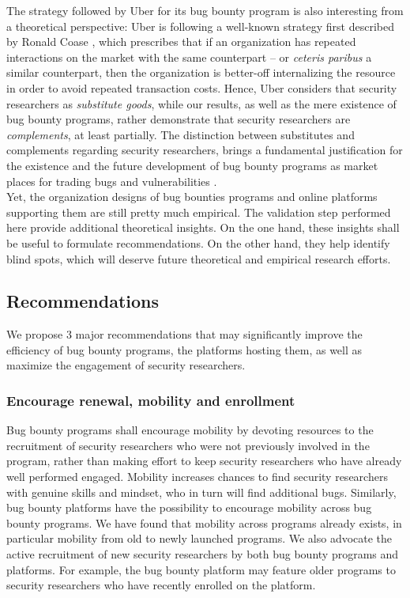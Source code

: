 The strategy followed by Uber for its bug bounty program is also interesting from a theoretical perspective: Uber is following a well-known strategy first described by Ronald Coase \cite{coase1937}, which prescribes that if an organization has repeated interactions on the market with the same counterpart -- or {\it ceteris paribus} a similar counterpart, then the organization is better-off internalizing the resource in order to avoid repeated transaction costs. Hence, Uber considers that security researchers as {\it substitute goods}, while our results, as well as the mere existence of bug bounty programs, rather demonstrate that security researchers are {\it complements}, at least partially. The distinction between substitutes and complements regarding security researchers, brings a fundamental justification for the existence and the future development of bug bounty programs as market places for trading bugs and vulnerabilities \cite{bohme2006comparison}. \\

Yet, the organization designs of bug bounties programs and online platforms supporting them are still pretty much empirical. The validation step performed here provide additional theoretical insights. On the one hand, these insights shall be useful to formulate recommendations. On the other hand, they help identify blind spots, which will deserve future theoretical and empirical research efforts.

\subsection{Recommendations}
We propose 3 major recommendations that may significantly improve the efficiency of bug bounty programs, the platforms hosting them, as well as maximize the engagement of security researchers. 

\subsubsection{Encourage renewal, mobility and enrollment}
Bug bounty programs shall encourage mobility by devoting resources to the recruitment of security researchers who were not previously involved in the program, rather than making effort to keep security researchers who have already well performed engaged. Mobility increases chances to find security researchers with genuine skills and mindset, who in turn will find additional bugs. Similarly, bug bounty platforms have the possibility to encourage mobility across bug bounty programs. We have found that mobility across programs already exists, in particular mobility from old to newly launched programs. We also advocate the active recruitment of new security researchers by both bug bounty programs and platforms. For example, the bug bounty platform may feature older programs to security researchers who have recently enrolled on the platform.

